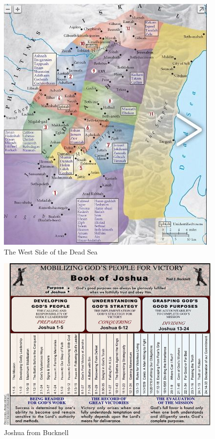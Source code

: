 \newpage
\begin{figure}
\begin{center}
\includegraphics[scale=1, angle=0]{06OT-Joshua/References/7.WestSideOfDeadSea.jpg}
\caption[The West Side of the Dead Sea]{The West Side of the Dead Sea}
\label{fig:The West Side of the Dead Sea}
\end{center}
\end{figure}


\newpage
\begin{figure}
\begin{center}
\includegraphics[scale=0.75, angle=90]{06OT-Joshua/References/8.Bucknell-Joshua.jpg}
\caption[Joshua from Bucknell]{Joshua from Bucknell}
\label{fig:Joshua from Bucknell}
\end{center}
\end{figure}



